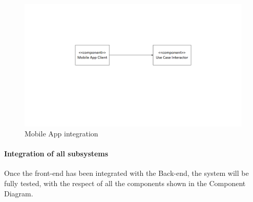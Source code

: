 \begin{figure}[H]
\centering
\includegraphics[width=\textwidth]{Images/BackEndIntegration.png}
\caption{\label{fig:BackEndIntegration} Mobile App integration}
\end{figure}

\paragraph{Integration of all subsystems}
Once the front-end has been integrated with the Back-end, the system will be fully tested, with the respect of all the components shown in the Component Diagram.


